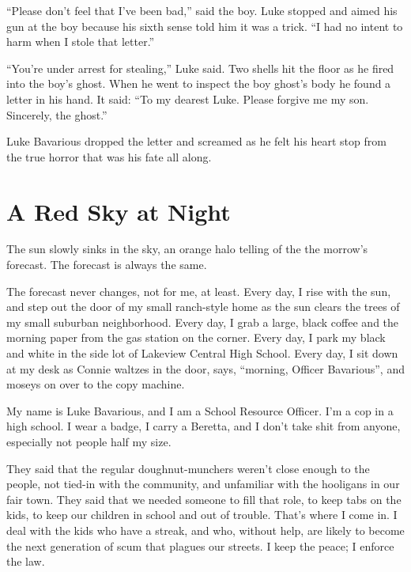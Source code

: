 ``Please don't feel that I've been bad,'' said the boy. Luke stopped
and aimed his gun at the boy because his sixth sense told him it
was a trick. ``I had no intent to harm when I stole that
letter.''



``You're under arrest for stealing,'' Luke said. Two shells hit the
floor as he fired into the boy's ghost. When he went to inspect the
boy ghost's body he found a letter in his hand. It said: ``To my
dearest Luke. Please forgive me my son. Sincerely, the
ghost.''



Luke Bavarious dropped the letter and screamed as he felt his heart
stop from the true horror that was his fate all along. 

 





\chapter{A Red Sky at Night}



The sun slowly sinks in the sky, an orange halo telling of the the
morrow's forecast. The forecast is always the same.



The forecast never changes, not for me, at least. Every day, I rise
with the sun, and step out the door of my small ranch-style home as
the sun clears the trees of my small suburban neighborhood. Every
day, I grab a large, black coffee and the morning paper from the
gas station on the corner. Every day, I park my black and white in
the side lot of Lakeview Central High School. Every day, I sit down
at my desk as Connie waltzes in the door, says, ``morning, Officer
Bavarious'', and moseys on over to the copy machine.



My name is Luke Bavarious, and I am a School Resource Officer. I'm
a cop in a high school. I wear a badge, I carry a Beretta, and I
don't take shit from anyone, especially not people half my
size.



They said that the regular doughnut-munchers weren't close enough
to the people, not tied-in with the community, and unfamiliar with
the hooligans in our fair town. They said that we needed someone to
fill that role, to keep tabs on the kids, to keep our children in
school and out of trouble. That's where I come in. I deal with the
kids who have a streak, and who, without help, are likely to become
the next generation of scum that plagues our streets. I keep the
peace; I enforce the law.



